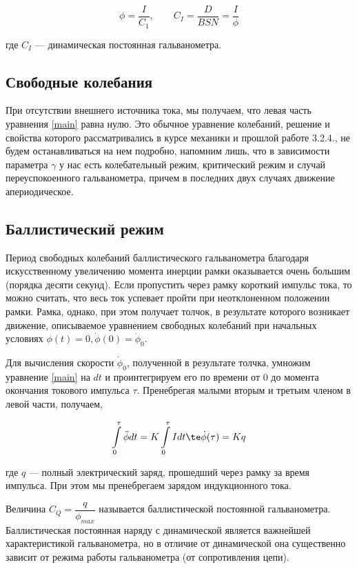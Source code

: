 \documentclass[a4paper,12pt]{article}
\begin{document}
\begin{equation}\label{C1}
\phi = \dfrac{I}{C_1}, \qquad C_I = \dfrac{D}{BSN} = \dfrac{I}{\phi}
\end{equation}

где $ C_I $ --- динамическая постоянная гальванометра.

\subsection{Свободные колебания}

При отсутствии внешнего источника тока, мы получаем, что левая часть уравнения \eqref{main} равна нулю. Это обычное уравнение колебаний, решение и свойства которого рассматривались в курсе механики и прошлой работе 3.2.4., не будем останавливаться на нем подробно, напомним лишь, что в зависимости параметра $ \gamma $ у нас есть колебательный режим, критический режим и случай переуспокоенного гальванометра, причем в последних двух случаях движение апериодическое. 

\subsection{Баллистический режим}

Период свободных колебаний баллистического гальванометра благодаря искусственному увеличению момента инерции рамки оказывается очень большим (порядка десяти секунд). Если пропустить через рамку короткий импульс тока, то можно считать, что весь ток успевает пройти при неотклоненном положении рамки. Рамка, однако, при этом получает толчок, в результате которого возникает движение, описываемое уравнением свободных колебаний при начальных условиях $ \phi(t) = 0, \dot{\phi }(0) = \dot{\phi }_0 $.

Для вычисления скорости $ \dot{\phi }_0 $, полученной в результате толчка, умножим уравнение \eqref{main} на $ dt $ и проинтегрируем его по времени от 0 до момента окончания токового импульса $ \tau $. Пренебрегая малыми вторым и третьим членом в левой части, получаем,

\begin{equation}\label{q}
\int\limits_0^\tau \ddot{\phi}dt = K 	\int\limits_0^\tau I dt \te \dot{\phi }(\tau) = Kq
\end{equation}

где $ q $ --- полный электрический заряд, прошедший через рамку за время импульса. При этом мы пренебрегаем зарядом индукционного тока.


Величина $ C_Q = \dfrac{q}{\phi_{max}}$ называется баллистической постоянной гальванометра. Баллистическая постоянная наряду с динамической является важнейшей характеристикой гальванометра, но в отличие от динамической она существенно зависит от режима работы гальванометра (от сопротивления цепи).
\end{document}
